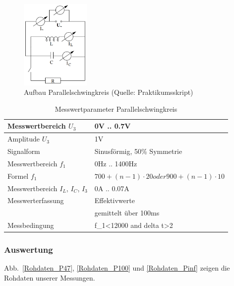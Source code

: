 \documentclass[12pt,a4paper]{article}
\begin{document}
\begin{figure}[H]
	\centering
	\includegraphics[width=0.3\textwidth]{Daten/Aufbau_Parallelschwingkreis.png}
	\caption{Aufbau Parallelschwingkreis (Quelle: Praktikumsskript)}
	\label{Aufbau_Parallelschaltung}
\end{figure}

\begin{table}[H]
	\centering
	\begin{tabular}{|l|l|}
		\hline
		Messwertbereich $U_3$&0V .. 0.7V\\
		\hline
		Amplitude $U_3$&1V\\
		\hline
		Signalform&Sinusförmig, 50\% Symmetrie\\
		\hline
		Messwertbereich $f_1$&0Hz .. 1400Hz\\
		\hline
		Formel $f_1$&$700+(n-1)\cdot20 oder 900+(n-1)\cdot10$\\
		\hline
		Messwertbereich $I_L$, $I_C$, $I_3$&0A .. 0.07A\\
		\hline
		Messwerterfassung&Effektivwerte\\
		&gemittelt über 100ms\\
		\hline
		Messbedingung&f\_1<12000 and delta t>2\\
		\hline
	\end{tabular}
	\caption{Messwertparameter Parallelschwingkreis}
	\label{table:Messwerterfassung_P}
\end{table}


\subsubsection{Auswertung}
Abb.~\ref{Rohdaten_P47}, \ref{Rohdaten_P100} und \ref{Rohdaten_Pinf} zeigen die Rohdaten unserer Messungen.
\end{document}
